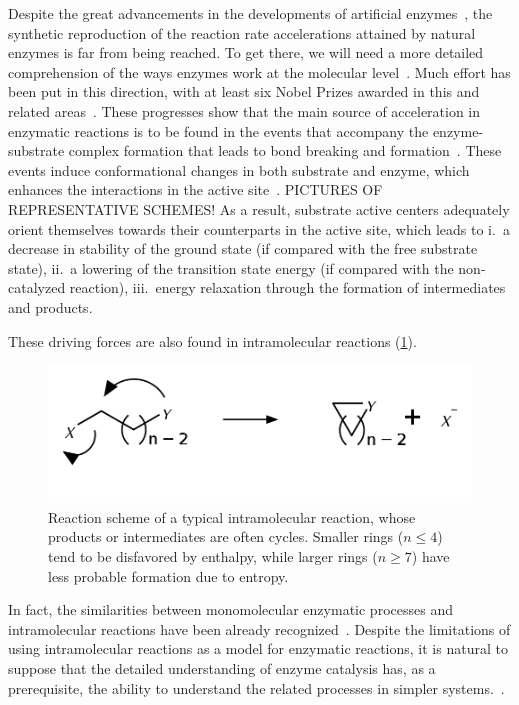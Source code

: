 Despite the great advancements in the developments of artificial enzymes~\cite{Breslow_1995},
the synthetic reproduction of the reaction rate accelerations attained by
natural enzymes is far from being reached.
To get there,
we will need a more detailed comprehension of the ways enzymes
work at the molecular level~\cite{Catalysis_in_Chemistry_and_Enzymology}.
Much effort has been put in this direction,
with at least six Nobel Prizes
awarded in this and related areas~\cite{Nobel_1929,Nobel_1946,Nobel_1957,Nobel_1975,Nobel_1997,Nobel_2013}.
These progresses show that the main source of acceleration in
enzymatic reactions is to be found in the events that accompany the
enzyme-substrate complex formation that leads to bond breaking and
formation~\cite{Catalysis_in_Chemistry_and_Enzymology}.
These events induce conformational changes in both substrate and enzyme,
which
enhances the interactions in the active site~\cite{Fischer_1890,Fischer_1894,Koshland_1958,Dafforn_1971,Kirby_1996}.
PICTURES OF REPRESENTATIVE SCHEMES!\@
As a result,
substrate active centers adequately orient themselves towards
their counterparts in the active site,
which leads to
i.\ a decrease in stability of the ground state (if compared with the
free substrate state),
ii.\ a lowering of the transition state energy (if compared with the
non-catalyzed reaction),
iii.\ energy relaxation through the formation of intermediates and
products.

These driving forces are also found in intramolecular reactions (\cref{fig:reacoes-intramoleculares}).
%
\begin{figure}[hbtp]
	\centering
	\includegraphics[width=.6\textwidth]{figures/reacao-intramolecular}
	\caption[Typical scheme of an intramolecular reactions]{
		Reaction scheme of a typical intramolecular reaction,
		whose products or
		intermediates are often cycles.
		Smaller rings ($n \le 4 $)
		tend to be disfavored by enthalpy,
		while larger rings ($n \ge 7 $)
		have less probable formation due to entropy.}%
	\label{fig:reacoes-intramoleculares}
\end{figure}
%
In fact,
the similarities between monomolecular enzymatic processes and
intramolecular reactions have been already recognized~\cite{Nilsson_1933,Bruice_1960b,Jung_1990}.
Despite the limitations of using intramolecular reactions as a model for
enzymatic reactions,
it is natural to suppose that the detailed understanding
of enzyme catalysis has,
as a prerequisite,
the ability to understand the
related processes in simpler systems.~\cite{Kirby_1972}.


